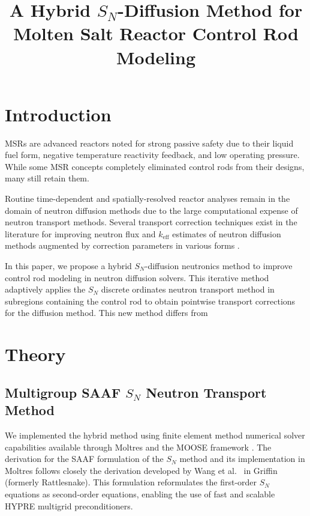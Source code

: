\documentclass[letterpaper]{mc2025}
\title{A Hybrid $S_N$-Diffusion Method for Molten Salt Reactor Control Rod Modeling}
\begin{document}
\section{Introduction}\label{sec:1}

\glspl*{MSR} are advanced reactors noted for strong passive safety due to their liquid fuel form,
negative temperature reactivity feedback, and low operating pressure. While some \gls*{MSR} concepts
completely eliminated control rods from their designs, many still retain them.

Routine time-dependent and spatially-resolved reactor analyses remain in the domain of neutron
diffusion methods due to the large computational expense of neutron transport methods. Several
transport correction techniques exist in the literature for improving neutron flux and
$k_\text{eff}$ estimates of neutron diffusion methods augmented by correction parameters in
various forms
\cite{kavenoky_sph_1978, koebke_new_1980, gross_comprehensive_2023, tamang_multilevel_2014}.

In this paper, we propose a hybrid $S_N$-diffusion neutronics method to improve control rod
modeling in neutron diffusion solvers. This iterative method adaptively applies the $S_N$ discrete
ordinates neutron transport method in subregions containing the control rod to obtain pointwise
transport corrections for the diffusion method.
This new method differs from 

\section{Theory} \label{sec:theory}

\subsection{Multigroup \Gls{SAAF} $S_N$ Neutron Transport Method} \label{sec:saaf}

We implemented the hybrid method using finite element method numerical solver capabilities available through
Moltres \cite{lindsay_introduction_2018} and the \gls*{MOOSE} framework \cite{giudicelli_30_2024}.
The derivation for the \gls*{SAAF} formulation of the $S_N$ method and its
implementation in Moltres follows closely the derivation developed by Wang et al.\
\cite{wang_diffusion_2014} in Griffin (formerly Rattlesnake). This formulation reformulates
the first-order $S_N$ equations as second-order equations, enabling the use of fast and scalable
HYPRE multigrid preconditioners.
\end{document}
